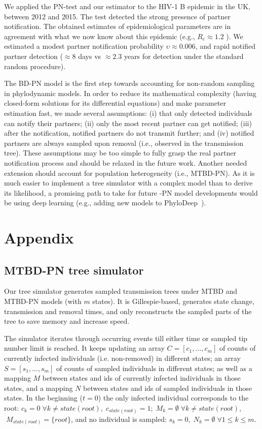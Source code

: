 \documentclass[a4paper,10pt]{article}
\begin{document}
We applied the PN-test and our estimator to the HIV-1 B epidemic in the UK, between 2012 and 2015. The test detected the strong presence of partner notification. The obtained estimates of epidemiological parameters are in agreement with what we now know about this epidemic (e.g., $R_e \approx 1.2$ ). We estimated a modest partner notification probability $\upsilon \approx 0.006$, and rapid notified partner detection ($\approx 8$ days vs $\approx2.3$ years for detection under the standard random procedure).

The BD-PN model is the first step towards accounting for non-random sampling in phylodynamic models. In order to reduce its mathematical complexity (having closed-form solutions for its differential equations) and make parameter estimation fast, we made several assumptions: (i) that only detected individuals can notify their partners; (ii) only the most recent partner can get notified; (iii) after the notification, notified partners do not transmit further; and (iv) notified partners are always sampled upon removal (i.e., observed in the transmission tree). These assumptions may be too simple to fully grasp the real partner notification process and should be relaxed in the future work. Another needed extension should account for population heterogeneity (i.e., MTBD-PN). As it is much easier to implement a tree simulator with a complex model than to derive its likelihood, a promising path to take for future -PN model developments would be using deep learning (e.g., adding new models to PhyloDeep~\citep{Voznica2021}). 






\section{Appendix}


\subsection{MTBD-PN tree simulator}

Our tree simulator generates sampled transmission trees under MTBD and MTBD-PN models (with $m$ states). It is Gillespie-based, generates state change, transmission and removal times, and only reconstructs the sampled parts of the tree to save memory and increase speed.  

The simulator iterates through occurring events till either time or sampled tip number limit is reached. 
It keeps updating an array $C = [c_1, \ldots, c_m]$ of counts of currently infected individuals (i.e. non-removed) in different states; an array $S = [s_1, \ldots, s_m]$ of counts of sampled individuals in different states; as well as a mapping $M$ between states and ids of currently infected individuals in those states, and a mapping $N$ between states and ids of sampled individuals in those states.  In the beginning ($t=0$) the only infected individual corresponds to the root: $c_k = 0 \;\forall k \neq state(root), \;c_{state(root)} = 1; \;M_k = \emptyset \; \forall k \neq state(root)$, $ \; M_{state(root)} = \{root\}$, and no individual is sampled: $s_k=0,\;N_k = \emptyset \; \forall 1 \leq k \leq m$.
\end{document}
